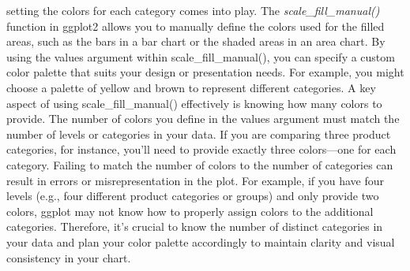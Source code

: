 \documentclass[
  letterpaper,
  DIV=11,
  numbers=noendperiod]{scrreprt}
\begin{document}
\begin{itemize}
  setting the colors for each category comes into play. The
  \emph{scale\_fill\_manual()} function in ggplot2 allows you to
  manually define the colors used for the filled areas, such as the bars
  in a bar chart or the shaded areas in an area chart. By using the
  values argument within scale\_fill\_manual(), you can specify a custom
  color palette that suits your design or presentation needs. For
  example, you might choose a palette of yellow and brown to represent
  different categories. A key aspect of using scale\_fill\_manual()
  effectively is knowing how many colors to provide. The number of
  colors you define in the values argument must match the number of
  levels or categories in your data. If you are comparing three product
  categories, for instance, you'll need to provide exactly three
  colors---one for each category. Failing to match the number of colors
  to the number of categories can result in errors or misrepresentation
  in the plot. For example, if you have four levels (e.g., four
  different product categories or groups) and only provide two colors,
  ggplot may not know how to properly assign colors to the additional
  categories. Therefore, it's crucial to know the number of distinct
  categories in your data and plan your color palette accordingly to
  maintain clarity and visual consistency in your chart.
\end{itemize}
\end{document}
